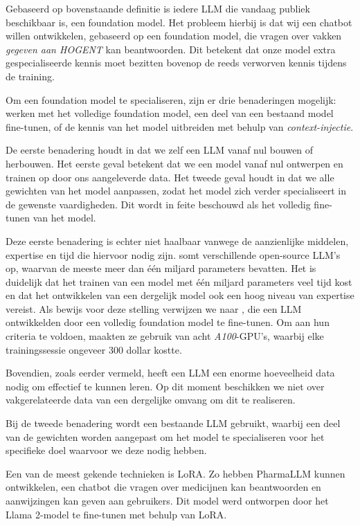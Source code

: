 Gebaseerd op bovenstaande definitie is iedere \acrshort{LLM} die vandaag publiek beschikbaar is, een foundation model. Het probleem hierbij is dat wij een chatbot willen ontwikkelen, gebaseerd op een foundation model, die vragen over vakken \emph{gegeven aan HOGENT} kan beantwoorden. Dit betekent dat onze model extra gespecialiseerde kennis moet bezitten bovenop de reeds verworven kennis tijdens de training.

Om een foundation model te specialiseren, zijn er drie benaderingen mogelijk: werken met het volledige foundation model, een deel van een bestaand model fine-tunen, of de kennis van het model uitbreiden met behulp van \emph{context-injectie}.

De eerste benadering houdt in dat we zelf een \acrshort{LLM} vanaf nul bouwen of herbouwen. Het eerste geval betekent dat we een model vanaf nul ontwerpen en trainen op door ons aangeleverde data. Het tweede geval houdt in dat we alle gewichten van het model aanpassen, zodat het model zich verder specialiseert in de gewenste vaardigheden. Dit wordt in feite beschouwd als het volledig fine-tunen van het model.

Deze eerste benadering is echter niet haalbaar vanwege de aanzienlijke middelen, expertise \autocite{Naveed2023} en tijd die hiervoor nodig zijn. \textcite{Fourrier2024} somt verschillende open-source \acrshort{LLM}'s op, waarvan de meeste meer dan één miljard parameters bevatten. Het is duidelijk dat het trainen van een model met één miljard parameters veel tijd kost en dat het ontwikkelen van een dergelijk model ook een hoog niveau van expertise vereist. Als bewijs voor deze stelling verwijzen we naar \textcite{Chiang2023}, die een \acrshort{LLM} ontwikkelden door een volledig foundation model te fine-tunen. Om aan hun criteria te voldoen, maakten ze gebruik van acht \emph{A100}-GPU’s, waarbij elke trainingssessie ongeveer 300 dollar kostte.

Bovendien, zoals eerder vermeld, heeft een \acrshort{LLM} een enorme hoeveelheid data nodig om effectief te kunnen leren. Op dit moment beschikken we niet over vakgerelateerde data van een dergelijke omvang om dit te realiseren.

Bij de tweede benadering wordt een bestaande \acrshort{LLM} gebruikt, waarbij een deel van de gewichten worden aangepast om het model te specialiseren voor het specifieke doel waarvoor we deze nodig hebben.

Een van de meest gekende technieken is \acrfull{LoRA}. Zo hebben \textcite{Azam2024} PharmaLLM kunnen ontwikkelen, een chatbot die vragen over medicijnen kan beantwoorden en aanwijzingen kan geven aan gebruikers. Dit model werd ontworpen door het Llama 2-model te fine-tunen met behulp van \acrshort{LoRA}. 

